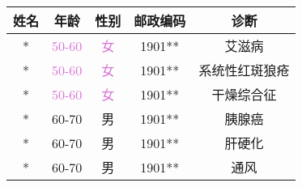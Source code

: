\begin{tabular}{ccccc}
    \toprule
    \textbf{姓名} & \textbf{年龄} & \textbf{性别} & \textbf{邮政编码} & \textbf{诊断} \\\midrule
    * & \textcolor{Orchid}{50-60} & \textcolor{Orchid}{女} & 1901** & 艾滋病 \\ 
    * & \textcolor{Orchid}{50-60} & \textcolor{Orchid}{女} & 1901** & 系统性红斑狼疮 \\ 
    * & \textcolor{Orchid}{50-60} & \textcolor{Orchid}{女} & 1901** & 干燥综合征 \\ 
    * & 60-70 & 男 & 1901** & 胰腺癌 \\ 
    * & 60-70 & 男 & 1901** & 肝硬化 \\ 
    * & 60-70 & 男 & 1901** & 通风 \\ \bottomrule
    \end{tabular}